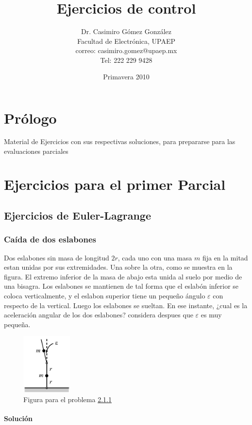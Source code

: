\documentclass[12pt]{book}
\title{Ejercicios de control}
\author{Dr. Casimiro Gómez González\\
	Facultad de Electrónica, UPAEP\\
               correo: casimiro.gomez@upaep.mx\\
               Tel: 222 229 9428}
\date{Primavera 2010}
\theoremstyle{definition}
\theoremstyle{remark}
\theoremstyle{plain}
\begin{document}
\frontmatter
\maketitle
\chapter{Prólogo}
Material de Ejercicios con sus respectivas soluciones, para prepararse para las evaluaciones parciales

\tableofcontents

\mainmatter

\chapter{Ejercicios para el primer Parcial}

\section{Ejercicios de Euler-Lagrange}

\subsection{Caída de dos eslabones}
\label{p4}
Dos eslabones sin masa de longitud $2r$, cada uno con una masa $m$ fija en la mitad estan unidas por sus extremidades. Una sobre la otra, como se muestra en la figura. El extremo inferior de la masa de abajo esta unida al suelo por medio de una bisagra. Los eslabones se mantienen de tal forma que el eslabón inferior se coloca verticalmente, y el eslabon superior tiene un pequeño ángulo $\varepsilon$ con respecto de la vertical. Luego los eslabones se sueltan. En ese instante, ¿cual es la aceleración angular de los dos eslabones? considera despues que $\varepsilon$ es muy pequeña.
\begin{figure}
\centering
\includegraphics[width=1in]{doseslabones.jpeg}
\caption{Figura para el problema \ref{p4}}
\label{fig4}
\end{figure}

\subsubsection{Solución}
\end{document}
